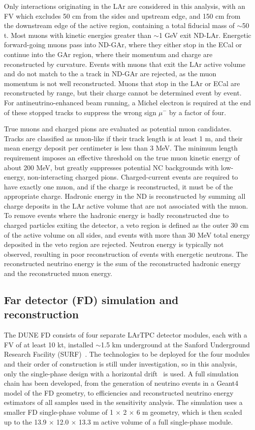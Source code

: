 Only interactions originating in the LAr are considered in this analysis, with an FV which excludes 50 cm from the sides and upstream edge, and 150 cm from the downstream edge of the active region, containing a total fiducial mass of $\sim$50 t. Most muons with kinetic energies greater than $\sim$1 GeV exit ND-LAr. Energetic forward-going muons pass into ND-GAr, where they either stop in the ECal or continue into the GAr region, where their momentum and charge are reconstructed by curvature. Events with muons that exit the LAr active volume and do not match to the a track in ND-GAr are rejected, as the muon momentum is not well reconstructed. Muons that stop in the LAr or ECal are reconstructed by range, but their charge cannot be determined event by event. For antineutrino-enhanced beam running, a Michel electron is required at the end of these stopped tracks to suppress the wrong sign $\mu^-$ by a factor of four.

True muons and charged pions are evaluated as potential muon candidates. Tracks are classified as muon-like if their track length is at least 1 m, and their mean energy deposit per centimeter is less than 3 MeV. The minimum length requirement imposes an effective threshold on the true muon kinetic energy of about 200 MeV, but greatly suppresses potential NC backgrounds with low-energy, non-interacting charged pions. Charged-current events are required to have exactly one muon, and if the charge is reconstructed, it must be of the appropriate charge. Hadronic energy in the ND is reconstructed by summing all charge deposits in the LAr active volume that are not associated with the muon. To remove events where the hadronic energy is badly reconstructed due to charged particles exiting the detector, a veto region is defined as the outer 30 cm of the active volume on all sides, and events with more than 30 MeV total energy deposited in the veto region are rejected. Neutron energy is typically not observed, resulting in poor reconstruction of events with energetic neutrons. The reconstructed neutrino energy is the sum of the reconstructed hadronic energy and the reconstructed muon energy.

\subsection{Far detector (FD) simulation and reconstruction}
The DUNE FD consists of four separate LArTPC detector modules, each with a FV of at least 10 kt, installed $\sim$1.5 km underground at the Sanford Underground Research Facility (SURF)~\cite{Abi:2018dnh}. The technologies to be deployed for the four modules and their order of construction is still under investigation, so in this analysis, only the single-phase design with a horizontal drift~\cite{Abi:2020loh} is used. A full simulation chain has been developed, from the generation of neutrino events in a Geant4 model of the FD geometry, to efficiencies and reconstructed neutrino energy estimators of all samples used in the sensitivity analysis. The simulation uses a smaller FD single-phase volume of 1 $\times$ 2 $\times$ 6 m geometry, which is then scaled up to the 13.9 $\times$ 12.0 $\times$ 13.3 m active volume of a full single-phase module.

